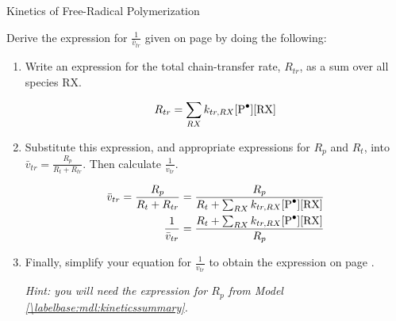 \begin{activity}{Kinetics of Free-Radical Polymerization}
\begin{exercises}
	\exercise Derive the expression for $\frac{1}{\bar v_{tr}}$ given on page \pageref{\labelbase:info:vtr} by doing the following:
	
		\label{\labelbase:exc:chainxfer}
		
		\begin{enumerate}
			\item Write an expression for the total chain-transfer rate, $R_{tr}$, as a sum over all species RX.
			
				\begin{solution}{}
					\begin{equation*}
						R_{tr} = \sum_{RX} k_{tr,RX}[\text{\ce{P^.}}][\text{RX}]
					\end{equation*}
				\end{solution}
				
			\item Substitute this expression, and appropriate expressions for $R_p$ and $R_t$, into $\bar v_{tr} = \frac{R_p}{R_t + R_{tr}}$.  Then calculate $\frac{1}{v_{tr}}$.
			
				\begin{solution}{}
					\begin{align*}
						\bar v_{tr} = \frac{R_p}{R_t + R_{tr}}
							&= \frac{R_p}{R_t + \sum_{RX} k_{tr,RX}[\text{\ce{P^.}}][\text{RX}]}\\
						\frac{1}{\bar v_{tr}} &= \frac{R_t + \sum_{RX} k_{tr,RX}[\text{\ce{P^.}}][\text{RX}]}{R_p}
					\end{align*}
				\end{solution}
				
			\item Finally, simplify your equation for $\frac{1}{v_{tr}}$ to obtain the expression on page \pageref{\labelbase:info:vtr}.
			
				\emph{Hint: you will need the expression for $R_p$ from Model \ref{\labelbase:mdl:kineticssummary}.}
			

\end{enumerate}
\end{exercises}
\end{activity}
